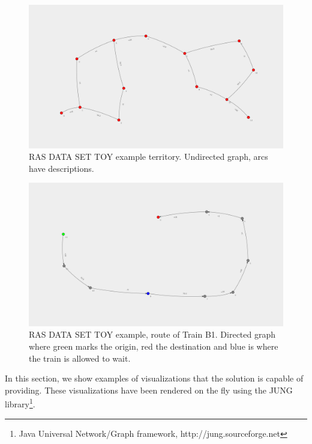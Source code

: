 \documentclass[10pt,a4paper,final]{article}
\begin{document}
\begin{figure}
\centering
\includegraphics[width=190mm,angle=90]{solution.png}
\caption{RAS DATA SET TOY example territory. Undirected graph, arcs have descriptions.}
\end{figure}

\begin{figure}
\includegraphics[width=190mm,angle=90]{B1.png}
\centering
\caption{RAS DATA SET TOY example, route of Train B1. Directed graph where green marks the origin, red the destination and blue is where the train is allowed to wait.}
\end{figure}

In this section, we show examples of visualizations that the solution is capable of providing. These visualizations have been rendered on the fly using the JUNG library\footnote{Java Universal Network/Graph framework, http://jung.sourceforge.net}.
\end{document}
